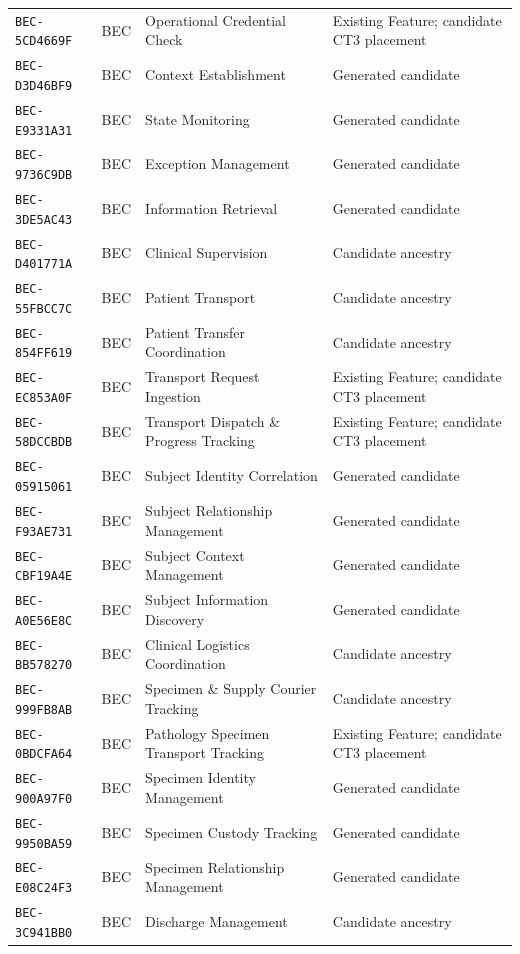 \documentclass[11pt,a4paper,openany]{book}
\begin{document}
\begin{longtable}{@{}p{.19\linewidth}p{.12\linewidth}p{.39\linewidth}p{.24\linewidth}@{}}
\texttt{BEC-5CD4669F} & BEC & Operational Credential Check & Existing Feature; candidate CT3 placement \\
\texttt{BEC-D3D46BF9} & BEC & Context Establishment & Generated candidate \\
\texttt{BEC-E9331A31} & BEC & State Monitoring & Generated candidate \\
\texttt{BEC-9736C9DB} & BEC & Exception Management & Generated candidate \\
\texttt{BEC-3DE5AC43} & BEC & Information Retrieval & Generated candidate \\
\texttt{BEC-D401771A} & BEC & Clinical Supervision & Candidate ancestry \\
\texttt{BEC-55FBCC7C} & BEC & Patient Transport & Candidate ancestry \\
\texttt{BEC-854FF619} & BEC & Patient Transfer Coordination & Candidate ancestry \\
\texttt{BEC-EC853A0F} & BEC & Transport Request Ingestion & Existing Feature; candidate CT3 placement \\
\texttt{BEC-58DCCBDB} & BEC & Transport Dispatch \& Progress Tracking & Existing Feature; candidate CT3 placement \\
\texttt{BEC-05915061} & BEC & Subject Identity Correlation & Generated candidate \\
\texttt{BEC-F93AE731} & BEC & Subject Relationship Management & Generated candidate \\
\texttt{BEC-CBF19A4E} & BEC & Subject Context Management & Generated candidate \\
\texttt{BEC-A0E56E8C} & BEC & Subject Information Discovery & Generated candidate \\
\texttt{BEC-BB578270} & BEC & Clinical Logistics Coordination & Candidate ancestry \\
\texttt{BEC-999FB8AB} & BEC & Specimen \& Supply Courier Tracking & Candidate ancestry \\
\texttt{BEC-0BDCFA64} & BEC & Pathology Specimen Transport Tracking & Existing Feature; candidate CT3 placement \\
\texttt{BEC-900A97F0} & BEC & Specimen Identity Management & Generated candidate \\
\texttt{BEC-9950BA59} & BEC & Specimen Custody Tracking & Generated candidate \\
\texttt{BEC-E08C24F3} & BEC & Specimen Relationship Management & Generated candidate \\
\texttt{BEC-3C941BB0} & BEC & Discharge Management & Candidate ancestry \\

\end{longtable}
\end{document}
